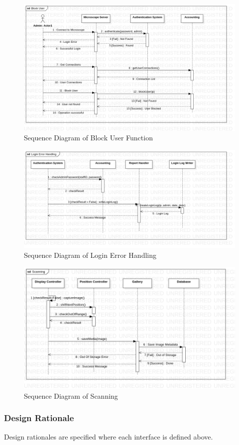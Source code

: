 \begin{figure}[H]
	\centering
	\includegraphics[scale=0.4]{Uml_Images/block_user_seq_diagram}
	\caption{Sequence Diagram of Block User Function}
	\label{fig:block_user_seq_diagram}
\end{figure}
\begin{figure}[H]
	\centering
	\includegraphics[scale=0.4]{Uml_Images/login_error_seq_diagram}
	\caption{Sequence Diagram of Login Error Handling}
	\label{fig:login_error_handling_seq_diagram}
\end{figure}
\begin{figure}[H]
	\centering
	\includegraphics[scale=0.4]{Uml_Images/scanning_seq_diagram}
	\caption{Sequence Diagram of Scanning}
	\label{fig:scanning_seq_diagram}
\end{figure}
\subsubsection{Design Rationale}
Design rationales are specified where each interface is defined above.